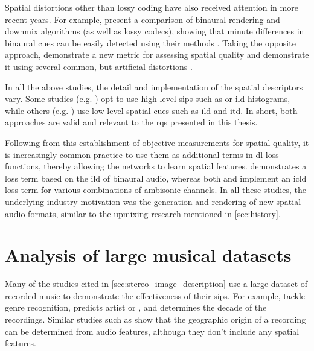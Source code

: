 Spatial distortions other than lossy coding have also received attention in more recent years. For example, \citeauthor{barryBinaspectPythonLibrary2025} present a comparison of binaural rendering and downmix algorithms (as well as lossy codecs), showing that minute differences in binaural cues can be easily detected using their methods \cite{barryBinaspectPythonLibrary2025}. Taking the opposite approach, \citeauthor{watcharasupatQuantifyingSpatialAudio2024} demonstrate a new metric for assessing spatial quality and demonstrate it using several common, but artificial distortions \cite{watcharasupatQuantifyingSpatialAudio2024}.

In all the above studies, the detail and implementation of the spatial descriptors vary. Some studies (e.g. \cite{delgadoObjectiveAssessmentSpatial2019,barryBinaspectPythonLibrary2025}) opt to use high-level \glspl{sip} such as  or \gls{ild} histograms, while others (e.g. \cite{wangObjectiveMeasurementSpatial2015}) use low-level spatial cues such as \gls{ild} and \gls{itd}. In short, both approaches are valid and relevant to the \glspl{rq} presented in this thesis. 

Following from this establishment of objective measurements for spatial quality, it is increasingly common practice to use them as additional terms in \gls{dl} loss functions, thereby allowing the networks to learn spatial features.  demonstrates a loss term based on the \gls{ild} of binaural audio, whereas both  and  implement an \gls{icld} loss term for various combinations of ambisonic channels. In all these studies, the underlying industry motivation was the generation and rendering of new spatial audio formats, similar to the upmixing research mentioned in \cref{sec:history}.


\section{Analysis of large musical datasets}

Many of the studies cited in \cref{sec:stereo_image_description} use a large dataset of recorded music to demonstrate the effectiveness of their \glspl{sip}. For example, \cite{tzanetakisStereoPanningFeatures2007,tzanetakisStereoPanningInformation2010,tardieuProductionEffectAudio2011} tackle genre recognition, \cite{ziemerAcousticFeaturesRecording2021} predicts artist or , and \cite{tardieuProductionEffectAudio2011} determines the decade of the recordings. Similar studies such as \cite{zhouPredictingGeographicalOrigin2014,kedyteGeographicalOriginPrediction2017} show that the geographic origin of a recording can be determined from audio features, although they don't  include any spatial features. 

